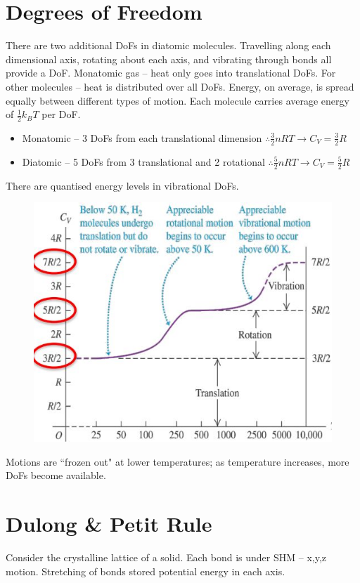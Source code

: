\documentclass[a4paper, 11pt, normalem]{report}
\begin{document}
\section{Degrees of Freedom}
There are two additional DoFs in diatomic molecules.
Travelling along each dimensional axis, rotating about each axis, and vibrating through bonds all provide a DoF.
Monatomic gas -- heat only goes into translational DoFs.
For other molecules -- heat is distributed over all DoFs.
Energy, on average, is spread equally between different types of motion.
Each molecule carries average energy of $\frac{1}{2}k_{B}T$ per DoF.
\begin{itemize}
    \item Monatomic -- 3 DoFs from each translational dimension $\therefore \frac{3}{2}nRT \rightarrow C_{V} = \frac{3}{2}R$
    \item Diatomic -- 5 DoFs from 3 translational and 2 rotational $\therefore \frac{5}{2}nRT \rightarrow C_{V} = \frac{5}{2}R$
\end{itemize}
There are quantised energy levels in vibrational DoFs.
\begin{figure}[H]
    \centering
    \includegraphics[scale=0.8]{Vibration.jpg}
\end{figure}
Motions are ``frozen out" at lower temperatures; as temperature increases, more DoFs become available.

\section{Dulong \& Petit Rule}
Consider the crystalline lattice of a solid.
Each bond is under SHM -- x,y,z motion.
Stretching of bonds stored potential energy in each axis.
\end{document}
